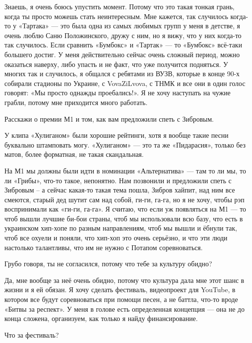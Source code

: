 Знаешь, я очень боюсь упустить момент. Потому что это такая тонкая грань, когда
ты просто можешь стать неинтересным. Мне кажется, так случилось когда-то у
«Тартака» --- это была одна из самых любимых групп у меня в детстве,   я очень
люблю Саню Положинского, дружу с ним, но я вижу, что у них когда-то так
случилось. Если сравнить «Бумбокс» и «Тартак» --- то «Бумбокс» всё-таки большего
достиг. У меня действительно сейчас очень сложный период, можно оказаться
наверху, либо упасть и не факт, что уже получится подняться. У многих так и
случилось, я общался с ребятами из ВУЗВ, которые в конце 90-х собирали стадионы
по Украине, с VovaZiLvova, с ТНМК и все они в один голос говорят: «Мы просто
однажды проебались!». Я не хочу наступать на чужие грабли, потому мне
приходится много работать.

Расскажи о премии М1 и том, как вам предложили спеть с Зибровым.

У клипа «Хулиганом» были хорошие рейтинги, хотя я вообще такие песни буквально
штамповать могу. «Хулиганом» --- это та же «Пидарасия», только без матов, более
форматная, не такая скандальная.

На М1 мы должны были идти в номинации «Альтернатива» --- там то ли мы, то ли
«Грибы», что-то такое, непонятно. Нам позвонили и предложили спеть с Зибровым –
а сейчас какая-то такая тема пошла, Зибров хайпит, над ним все смеются, старый
дед шутит сам над собой, ги-ги, га-га, но я не хочу, чтобы рэп воспринимали как
«ги-ги, га-га». Я считаю, что если уж появляться на М1 --- то чтоб вышли лучшие
би-бои страны, чтоб мы использовали всю базу, что есть в украинском хип-хопе по
разным направлениям, чтоб мы вышли и ёбнули так, чтоб все охуели и поняли, что
хип-хоп это очень серьёзно, и что эти люди настолько талантливы, что им не
нужно с Потапом соревноваться.

Грубо говоря, ты не согласился, потому что тебе за культуру обидно?

Да, мне вообще за неё очень обидно, потому что культура дала мне этот шанс в
жизни и я ей обязан. Я хочу сделать фестиваль, видеопроект для YouTube, в
котором все будут соревноваться при помощи песен, а не баттла, что-то вроде
«Битвы за респект». У меня в голове есть определенная концепция --- она не до
конца сложена, организуем, как только я найду финансирование.

Что за фестиваль?

